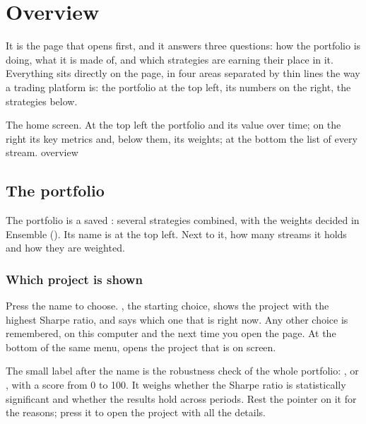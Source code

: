 \chapter{Overview}\label{cap:overview}

It is the page that opens first, and it answers three questions: how the
portfolio is doing, what it is made of, and which strategies are earning
their place in it. Everything sits directly on the page, in four areas
separated by thin lines the way a trading platform is: the portfolio at the
top left, its numbers on the right, the strategies below.

  {The home screen. At the top left the portfolio and its value over time;
   on the right its key metrics and, below them, its weights; at the bottom
   the list of every stream.}
  {overview}

\section{The portfolio}\label{sez:overview-chart}

The portfolio is a saved : several strategies combined, with
the weights decided in Ensemble (). Its name is at the top
left. Next to it, how many streams it holds and how they are weighted.

\subsection{Which project is shown}

Press the name to choose. , the starting choice, shows the
project with the highest Sharpe ratio, and says which one that is right now.
Any other choice is remembered, on this computer and the next time you open
the page. At the bottom of the same menu,  opens
the project that is on screen.

The small label after the name is the robustness check of the whole
portfolio: ,  or , with a
score from 0 to 100. It weighs whether the Sharpe ratio is statistically
significant and whether the results hold across periods. Rest the pointer on
it for the reasons; press it to open the project with all the details.

